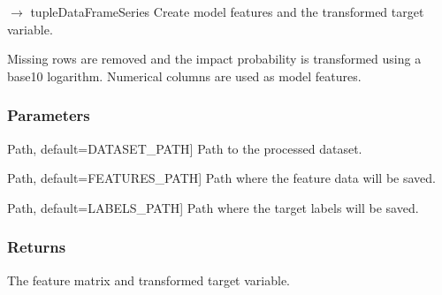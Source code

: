 \documentclass[letterpaper,10pt,english]{sphinxmanual}
\begin{document}
\begin{fulllineitems}
\label{\detokenize{modules:asteroid_impact.plots.create_features}}
\pysigstartsignatures
\pysiglinewithargsret
{}
{\sphinxparamcomma {}\sphinxparamcomma {}}
{{ $\rightarrow$ tuple\DUrole{p}{{[}}DataFrameSeries\DUrole{p}{{]}}}}
\pysigstopsignatures
\sphinxAtStartPar
Create model features and the transformed target variable.

\sphinxAtStartPar
Missing rows are removed and the impact probability is transformed using
a base\sphinxhyphen{}10 logarithm. Numerical columns are used as model features.


\subsubsection{Parameters}
\label{\detokenize{modules:id9}}\begin{description}
\sphinxlineitem{input\_path}{[}Path, default=DATASET\_PATH{]}
\sphinxAtStartPar
Path to the processed dataset.

\sphinxlineitem{features\_path}{[}Path, default=FEATURES\_PATH{]}
\sphinxAtStartPar
Path where the feature data will be saved.

\sphinxlineitem{labels\_path}{[}Path, default=LABELS\_PATH{]}
\sphinxAtStartPar
Path where the target labels will be saved.

\end{description}


\subsubsection{Returns}
\label{\detokenize{modules:id10}}\begin{description}
\sphinxAtStartPar
The feature matrix and transformed target variable.

\end{description}

\end{fulllineitems}
\end{document}
